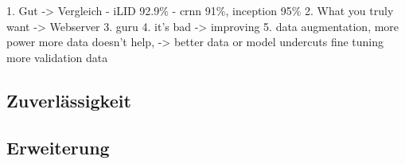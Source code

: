 \parencite{history}
1. Gut -> Vergleich
	- iLID 92.9\%
	- crnn 91\%, inception 95\%
2. What you truly want -> Webserver
3. guru 
4. it's bad -> improving
5. data augmentation, more power
more data doesn't help, -> better data or model undercuts
fine tuning
more validation data


\subsection{Zuverlässigkeit}
\subsection{Erweiterung}
